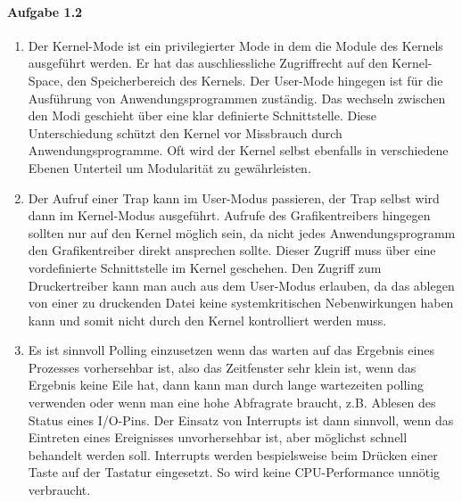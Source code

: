 \documentclass[11pt]{article}
\begin{document}

\paragraph{Aufgabe 1.2}
\begin{enumerate}[label=\alph*)]
\item Der Kernel-Mode ist ein privilegierter Mode in dem die Module des Kernels ausgeführt werden. Er hat das auschliessliche Zugriffrecht auf den Kernel-Space, den Speicherbereich des Kernels. Der User-Mode hingegen ist für die Ausführung von Anwendungsprogrammen zuständig. Das wechseln zwischen den Modi geschieht über eine klar definierte Schnittstelle. Diese Unterschiedung schützt den Kernel vor Missbrauch durch Anwendungsprogramme. Oft wird der Kernel selbst ebenfalls in verschiedene Ebenen Unterteil um Modularität zu gewährleisten.

\item Der Aufruf einer Trap kann im User-Modus passieren, der Trap selbst wird dann im Kernel-Modus ausgeführt. Aufrufe des Grafikentreibers hingegen sollten nur auf den Kernel möglich sein, da nicht jedes Anwendungsprogramm den Grafikentreiber direkt ansprechen sollte. Dieser Zugriff muss über eine vordefinierte Schnittstelle im Kernel geschehen. Den Zugriff zum Druckertreiber kann man auch aus dem User-Modus erlauben, da das ablegen von einer zu druckenden Datei keine systemkritischen Nebenwirkungen haben kann und somit nicht durch den Kernel kontrolliert werden muss.

\item Es ist sinnvoll Polling einzusetzen wenn das warten auf das Ergebnis eines Prozesses vorhersehbar ist, also das Zeitfenster sehr klein ist, wenn das Ergebnis keine Eile hat, dann kann man durch lange wartezeiten polling verwenden oder wenn man eine hohe Abfragrate braucht, z.B. Ablesen des Status eines I/O-Pins. Der Einsatz von Interrupts ist dann sinnvoll, wenn das Eintreten eines Ereignisses unvorhersehbar ist, aber möglichst schnell behandelt werden soll. Interrupts werden bespielsweise beim Drücken einer Taste auf der Tastatur eingesetzt. So wird keine CPU-Performance unnötig verbraucht.

\end{enumerate} 
\end{document}
